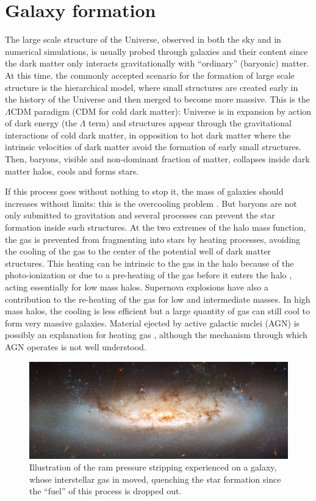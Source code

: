 \section{Galaxy formation}
\label{sec:galaxy_formation}

The large scale structure of the Universe, observed in both the sky and in
numerical simulations, is usually probed through galaxies and their content
since the dark matter only interacts gravitationally with ``ordinary''
(baryonic) matter. At this time, the commonly accepted scenario for the
formation of large scale structure is the hierarchical model, where small
structures are created early in the history of the Universe and then merged to
become more massive. This is the $\Lambda$CDM paradigm (CDM for cold dark
matter): Universe is in expansion by action of dark energy (the $\Lambda$ term)
and structures appear through the gravitational interactions of cold dark
matter, in opposition to hot dark matter where the intrinsic velocities of dark
matter avoid the formation of early small structures. Then, baryons, visible
and non-dominant fraction of matter, collapses inside dark matter halos, cools
and forms stars.

If this process goes without nothing to stop it, the mass of galaxies should
increases without limits: this is the overcooling problem \citep{White+78,
Blanchard+92}. But baryons are not only submitted to gravitation and several
processes can prevent the star formation inside such structures. At the two
extremes of the halo mass function, the gas is prevented from fragmenting into
stars by heating processes, avoiding the cooling of the gas to the center of
the potential well of dark matter structures. This heating can be intrinsic to
the gas in the halo because of the photo-ionization \citep{Rees+86} or due to a
pre-heating of the gas before it enters the halo \citep{Borgani+01}, acting
essentially for low mass halos. Supernova explosions have also a contribution
to the re-heating of the gas \citep{Dekel+86, Efstathiou+00} for low and
intermediate masses. In high mass halos, the cooling is less efficient but a
large quantity of gas can still cool to form very massive galaxies. Material
ejected by active galactic nuclei (AGN) is possibly an explanation for heating
gas \citep{Silk+98}, although the mechanism through which AGN operates is not
well understood.
%
\begin{figure}[htb]
    \centering
    \includegraphics[width=\linewidth]{figures/introduction/rampressure.jpg}
    \caption{Illustration of the ram pressure stripping experienced on a
    galaxy, whose interstellar gas in moved, quenching the star formation since
the ``fuel'' of this process is dropped out.\label{fig:rampressure}}
\end{figure}

